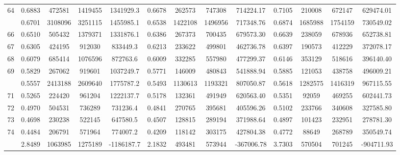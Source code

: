 \documentclass[
  12pt,
]{article}
\begin{document}
\begin{longtable}[t]{lcccccccccccc}
64 & 0.6883 & 472581 & 1419455 & 1341929.3 & 0.6678 & 262573 & 747308 & 714224.17 & 0.7105 & 210008 & 672147 & 629474.01\\
\addlinespace
65 & 0.6701 & 3108096 & 3251115 & 1455985.1 & 0.6538 & 1422108 & 1496956 & 717348.76 & 0.6874 & 1685988 & 1754159 & 730549.02\\
66 & 0.6510 & 505432 & 1379371 & 1331876.1 & 0.6386 & 267373 & 700435 & 679573.30 & 0.6639 & 238059 & 678936 & 652738.81\\
67 & 0.6305 & 424195 & 912030 & 833449.3 & 0.6213 & 233622 & 499801 & 462736.78 & 0.6397 & 190573 & 412229 & 372078.17\\
68 & 0.6079 & 685414 & 1076596 & 872763.6 & 0.6009 & 332285 & 557980 & 477299.37 & 0.6146 & 353129 & 518616 & 396140.40\\
69 & 0.5829 & 267062 & 919601 & 1037249.7 & 0.5771 & 146009 & 480843 & 541888.94 & 0.5885 & 121053 & 438758 & 496009.21\\
\addlinespace
70 & 0.5557 & 2413188 & 2609640 & 1775787.2 & 0.5493 & 1130613 & 1193321 & 807050.87 & 0.5618 & 1282575 & 1416319 & 967115.55\\
71 & 0.5265 & 224420 & 961204 & 1222137.7 & 0.5178 & 132361 & 491949 & 620563.40 & 0.5351 & 92059 & 469255 & 602441.73\\
72 & 0.4970 & 504531 & 736289 & 731236.4 & 0.4841 & 270765 & 395681 & 405596.26 & 0.5102 & 233766 & 340608 & 327585.80\\
73 & 0.4698 & 230238 & 522145 & 647580.5 & 0.4507 & 128815 & 289194 & 371988.64 & 0.4897 & 101423 & 232951 & 278781.30\\
74 & 0.4484 & 206791 & 571964 & 774007.2 & 0.4209 & 118142 & 303175 & 427804.38 & 0.4772 & 88649 & 268789 & 350549.74\\
\addlinespace
75 & 2.8489 & 1063985 & 1275189 & -1186187.7 & 2.1832 & 493481 & 573944 & -367006.78 & 3.7303 & 570504 & 701245 & -904711.93\\*
\end{longtable}
\endgroup{}
\end{document}
